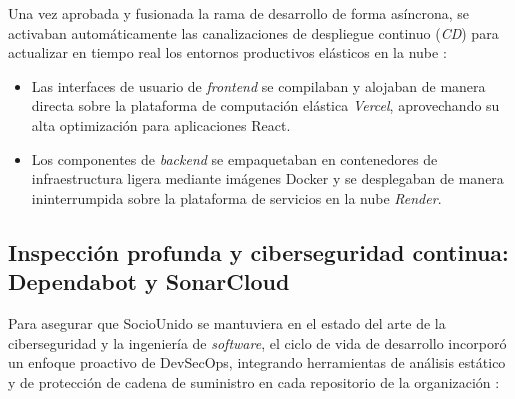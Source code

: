 Una vez aprobada y fusionada la rama de desarrollo de forma asíncrona, se activaban automáticamente las canalizaciones de despliegue continuo (\textit{CD}) para actualizar en tiempo real los entornos productivos elásticos en la nube :
\begin{itemize}
    \item Las interfaces de usuario de \textit{frontend} se compilaban y alojaban de manera directa sobre la plataforma de computación elástica \textit{Vercel}, aprovechando su alta optimización para aplicaciones React.
    \item Los componentes de \textit{backend} se empaquetaban en contenedores de infraestructura ligera mediante imágenes Docker y se desplegaban de manera ininterrumpida sobre la plataforma de servicios en la nube \textit{Render}.
\end{itemize}

\subsection{Inspección profunda y ciberseguridad continua: Dependabot y SonarCloud}

Para asegurar que SocioUnido se mantuviera en el estado del arte de la ciberseguridad y la ingeniería de \textit{software}, el ciclo de vida de desarrollo incorporó un enfoque proactivo de DevSecOps, integrando herramientas de análisis estático y de protección de cadena de suministro en cada repositorio de la organización :


